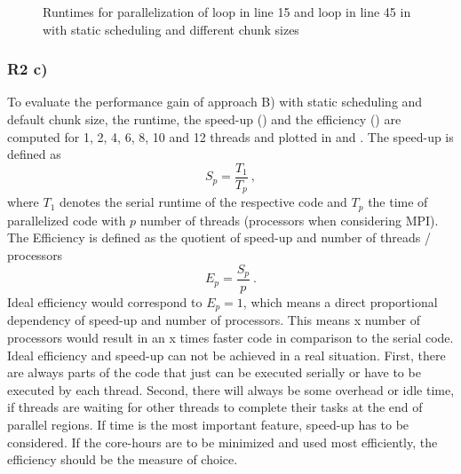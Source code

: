 \begin{figure}[h!]
	\centering
	\caption{\label{fig::OpenMPStatic} Runtimes for parallelization of loop in line 15 and loop in line 45 in  with static scheduling and different chunk sizes}
\end{figure}

\subsubsection{R2 c)}

To evaluate the performance gain of approach B) with static scheduling and default chunk size, the runtime, the speed-up () and the efficiency () are computed for 1, 2, 4, 6, 8, 10 and 12 threads and plotted in   and . The speed-up is defined as 
%
\begin{equation} \label{eq:SpeedUp}
	S_p = \frac{T_1}{T_p} \ ,
\end{equation}
%
where $T_1$ denotes the serial runtime of the respective code and $T_p$ the time of parallelized code with $p$ number of threads (processors when considering MPI). The Efficiency is defined as the quotient of speed-up and number of threads / processors 
%
\begin{equation}\label{eq:Efficiency}
	E_p = \frac{S_p}{p} \ .
\end{equation}
%
Ideal efficiency would correspond to $E_p=1$, which means a direct proportional dependency of speed-up and number of processors. This means x number of processors would result in an x times faster code in comparison to the serial code. Ideal efficiency and speed-up can not be achieved in a real situation. First, there are always parts of the code that just can be executed serially or have to be executed by each thread. Second, there will always be some overhead or idle time, if threads are waiting for other threads to complete their tasks at the end of parallel regions. If time is the most important feature, speed-up has to be considered. If the core-hours are to be minimized and used most efficiently, the efficiency should be the measure of choice.

